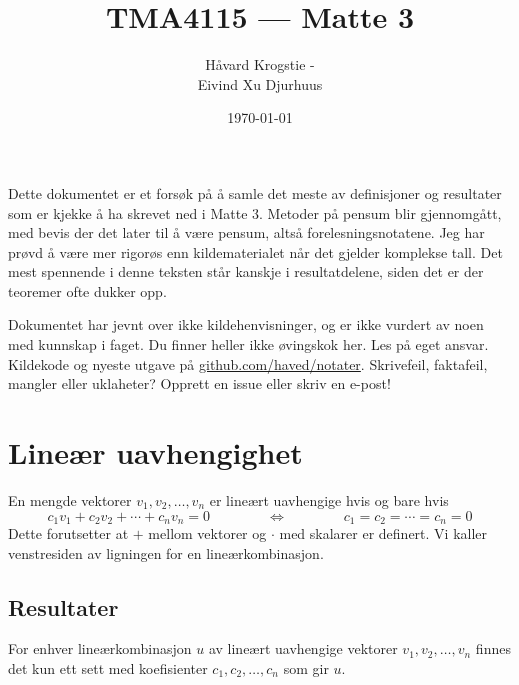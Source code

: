 \documentclass[12pt,a4paper,norsk]{article}
\title{TMA4115 --- Matte 3}
\author{Håvard Krogstie - \randomize{\lst{}.\fst{}@gmail.com} \\ Eivind Xu Djurhuus}
\date{\today}
\begin{document}
\maketitle

\noindent
Dette dokumentet er et forsøk på å samle det meste av definisjoner og resultater
som er kjekke å ha skrevet ned i Matte 3. Metoder på pensum blir gjennomgått,
med bevis der det later til å være pensum, altså forelesningsnotatene. Jeg har
prøvd å være mer rigorøs enn kildematerialet når det gjelder komplekse tall.
Det mest spennende i denne teksten står kanskje i resultatdelene, siden
det er der teoremer ofte dukker opp.

Dokumentet har jevnt over ikke kildehenvisninger, og er ikke vurdert av noen
med kunnskap i faget. Du finner heller ikke øvingskok her. Les på eget ansvar.
Kildekode og nyeste utgave på
\href{https://github.com/haved/notater/}{github.com/haved/notater}. Skrivefeil,
faktafeil, mangler eller uklaheter? Opprett en issue eller skriv en e-post!

\clearpage
\tableofcontents
\clearpage

\section{Lineær uavhengighet}
En mengde vektorer $v_{1}, v_{2}, \ldots, v_{n}$ er lineært uavhengige hvis og bare
hvis
\[c_{1}v_{1} + c_{2}v_{2} + \cdots + c_{n}v_{n} = 0 \hspace{4em} \Longleftrightarrow \hspace{4em} c_{1}=c_{2}=\cdots=c_{n}=0\]
Dette forutsetter at $+$ mellom vektorer og $\cdot$ med skalarer er definert. Vi
kaller venstresiden av ligningen for en lineærkombinasjon.

\subsection{Resultater}
For enhver lineærkombinasjon $u$ av lineært uavhengige vektorer
$v_{1}, v_{2}, \ldots, v_{n}$ finnes det kun ett sett med koefisienter
$c_{1}, c_{2}, \ldots, c_{n}$ som gir $u$.
\end{document}
